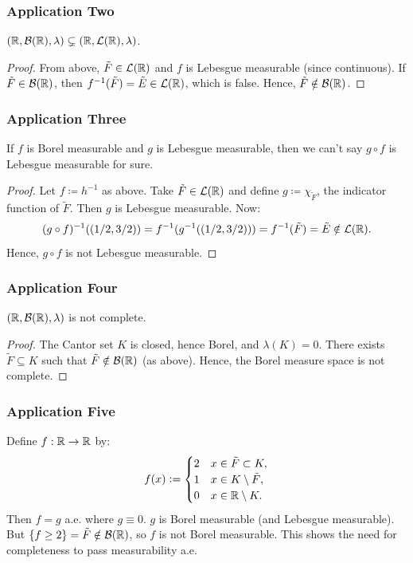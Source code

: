 \clearpage
\subsubsection{Application Two}
$(\mathbb{R}, \mathcal{B}(\mathbb{R}), \lambda) \subsetneq (\mathbb{R}, \mathcal{L}(\mathbb{R}), \lambda)$.

\begin{proof}
From above, $\tilde{F} \in \mathcal{L}(\mathbb{R})$ and $f$ is Lebesgue measurable (since continuous).
If $\tilde{F} \in \mathcal{B}(\mathbb{R})$, then $f^{-1}(\tilde{F}) = \tilde{E} \in \mathcal{L}(\mathbb{R})$, which is false.
Hence, $\tilde{F} \notin \mathcal{B}(\mathbb{R})$.
\end{proof}

\subsubsection{Application Three}
If $f$ is Borel measurable and $g$ is Lebesgue measurable, then we can't say $g \circ f$ is Lebesgue measurable for sure.

\begin{proof}
Let $f \coloneqq h^{-1}$ as above.
Take $\tilde{F} \in \mathcal{L}(\mathbb{R})$ and define $g \coloneqq \chi_{\tilde{F}}$, the indicator function of $\tilde{F}$.
Then $g$ is Lebesgue measurable.
Now:
\[
(g \circ f)^{-1}((1/2, 3/2)) = f^{-1}(g^{-1}((1/2, 3/2))) = f^{-1}(\tilde{F}) = \tilde{E} \notin \mathcal{L}(\mathbb{R}).
\]
Hence, $g \circ f$ is not Lebesgue measurable.
\end{proof}

\subsubsection{Application Four}
$(\mathbb{R}, \mathcal{B}(\mathbb{R}), \lambda)$ is not complete.

\begin{proof}
The Cantor set $K$ is closed, hence Borel, and $\lambda(K) = 0$.
There exists $\tilde{F} \subseteq K$ such that $\tilde{F} \notin \mathcal{B}(\mathbb{R})$ (as above).
Hence, the Borel measure space is not complete.
\end{proof}

\subsubsection{Application Five}
Define $f:\mathbb{R} \to \mathbb{R}$ by:
\[
f(x) \mathrel{\mathop:}= 
\begin{cases}
2 & x \in \tilde{F} \subset K, \\
1 & x \in K \setminus \tilde{F}, \\
0 & x \in \mathbb{R} \setminus K.
\end{cases}
\]
Then $f = g$ a.e. where $g \equiv 0$. $g$ is Borel measurable (and Lebesgue measurable).
But $\{f \geq 2\} = \tilde{F} \notin \mathcal{B}(\mathbb{R})$, so $f$ is not Borel measurable.
This shows the need for completeness to pass measurability a.e.

